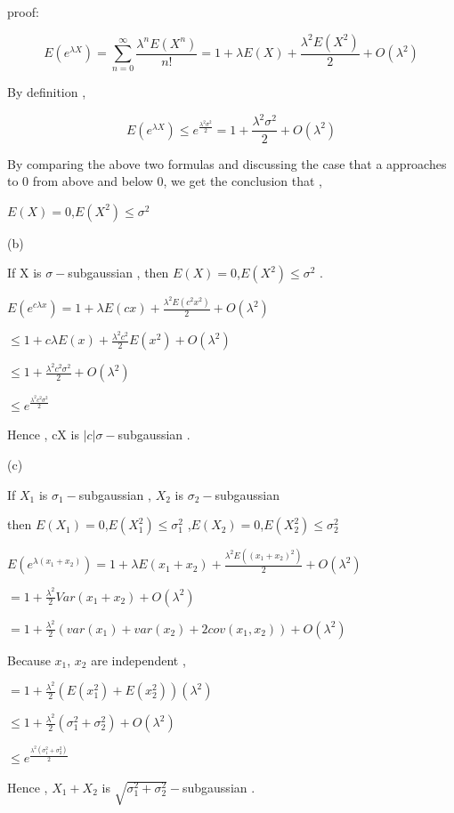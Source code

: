 proof:

\begin{equation}
E(e^{\lambda X}) = \sum_{n=0}^{\infty}\frac{\lambda^n E(X^n)}{n!}=1+\lambda E(X)+\frac{\lambda^2 E(X^2)}{2}+O(\lambda^2)
\end{equation}

By definition ,

\begin{equation}
E(e^{\lambda X})\leq e^{\frac{\lambda^2 \sigma^2}{2}}=1+\frac{\lambda^2 \sigma^2}{2}+O(\lambda^2)
\end{equation}

By comparing the above two formulas and discussing the case that a approaches to 0 from above and below 0, we get the conclusion that ,

$E(X)=0$,$E(X^2)\leq\sigma^2$

(b)

If X is $\sigma-$subgaussian , then $E(X)=0$,$E(X^2)\leq\sigma^2$ .

$E(e^{c\lambda x}) = 1+\lambda E(cx)+\frac{\lambda^2 E(c^2 x^2)}{2}+O(\lambda^2)$

$\leq 1+c\lambda E(x)+\frac{\lambda^2 c^2}{2} E(x^2)+O(\lambda^2)$

$\leq 1+\frac{\lambda^2 c^2 \sigma^2}{2}+O(\lambda^2)$

$\leq e^{\frac{\lambda^2 c^2 \sigma^2}{2}}$

Hence , cX is $|c|\sigma-$subgaussian .

(c)

If $X_1$ is $\sigma_1-$subgaussian , $X_2$ is $\sigma_2-$subgaussian

then $E(X_1)=0$,$E(X_1^2)\leq\sigma_1^2$ ,$E(X_2)=0$,$E(X_2^2)\leq\sigma_2^2$

$E(e^{\lambda (x_1+x_2)}) = 1+\lambda E(x_1+x_2)+\frac{\lambda^2 E((x_1+x_2)^2)}{2}+O(\lambda^2)$

$= 1+\frac{\lambda^2}{2} Var(x_1+x_2)+O(\lambda^2)$

$= 1+\frac{\lambda^2}{2} (var(x_1)+var(x_2)+2cov(x_1,x_2))+O(\lambda^2)$

Because $x_1$, $x_2$ are independent ,

$= 1+\frac{\lambda^2}{2} (E(x_1^2) + E(x_2^2))(\lambda^2)$

$\leq 1+\frac{\lambda^2}{2} (\sigma_1^2 + \sigma_2^2)+O(\lambda^2)$

$\leq e^{\frac{\lambda^2 (\sigma_1^2 + \sigma_2^2)}{2}}$

Hence , $X_1+X_2$ is $\sqrt{\sigma_1^2 + \sigma_2^2}-$subgaussian .



